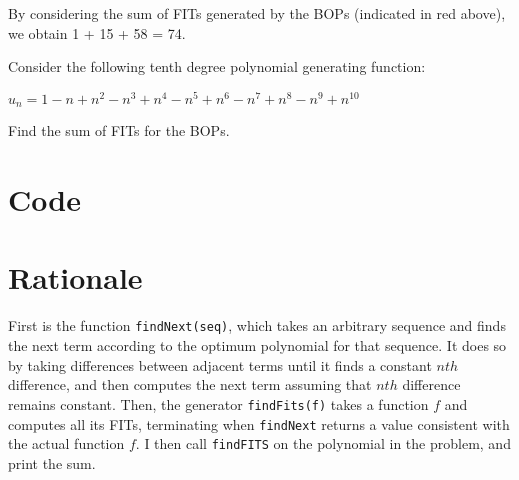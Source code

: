 \documentclass[11pt]{amsart}
\begin{document}
By considering the sum of FITs generated by the BOPs (indicated in red above), we obtain 1 + 15 + 58 = 74.

Consider the following tenth degree polynomial generating function:

$u_n = 1 - n + n^2 - n^3 + n^4 - n^5 + n^6 - n^7 + n^8 - n^9 + n^{10}$

Find the sum of FITs for the BOPs.

\newpage

\section{Code}


\section{Rationale}
First is the function \verb!findNext(seq)!, which takes an arbitrary sequence and finds the next term according to the optimum polynomial for that sequence. It does so by taking differences between adjacent terms until it finds a constant $nth$ difference, and then computes the next term assuming that $nth$ difference remains constant. Then, the generator \verb!findFits(f)! takes a function $f$ and computes all its FITs, terminating when \verb!findNext! returns a value consistent with the actual function $f$. I then call \verb!findFITS! on the polynomial in the problem, and print the sum.
\end{document}
